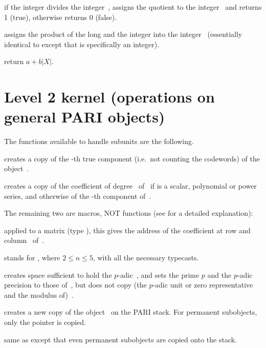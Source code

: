  if the integer  divides the
integer~, assigns the quotient to the integer~ and returns
1 (true), otherwise returns 0 (false).

 assigns the product of the long
 and the integer  into the integer~ (essentially
identical to  except that  is specifically an integer).

 return $a + b|X|$.

\section{Level 2 kernel (operations on general PARI objects)}

\noindent The functions available to handle subunits are the following.

 creates a copy of the -th true
component (i.e.\ not counting the codewords) of the object~.

 creates a copy of the coefficient of
degree~ of~ if  is a scalar, polynomial or power series,
and otherwise of the -th component of~.

\noindent %
The remaining two are macros, NOT functions (see  for a
detailed explanation):

 applied to a matrix  (type
), this gives the address of the coefficient at row  and
column~ of~.

 stands for
, where $2\le n \le 5$, with all the
necessary typecasts.


 creates space sufficient to hold the $p$-adic~,
and sets the prime $p$ and the $p$-adic precision to those of~, but
does not copy (the $p$-adic unit or zero representative and the modulus
of)~.

 creates a new copy of the object~ on the PARI
stack. For permanent subobjects, only the pointer is copied.

 same as  except that even permanent
subobjects are copied onto the stack.

